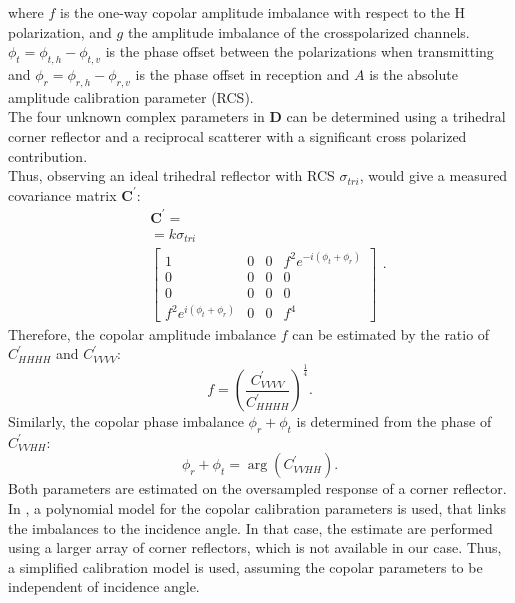 where $f$ is the one-way copolar amplitude imbalance with respect to the H polarization, and $g$ the amplitude imbalance of the crosspolarized channels. $\phi_t = \phi_{t,h} -\phi_{t,v}$ is the phase offset between the polarizations when transmitting and $\phi_{r} = \phi_{r,h} -\phi_{r,v}$ is the phase offset in reception and $A$ is the absolute amplitude calibration parameter (RCS)\cite{Ainsworth2006a, Fore2015}.\\
The four unknown complex parameters in $\mathbf{D}$ can be determined using a trihedral corner reflector and a reciprocal scatterer with a significant cross polarized contribution\cite{Sarabandi1989,Pipia2009}.\\
Thus, observing an ideal trihedral reflector with RCS $\sigma_{tri}$, would give 
a measured covariance matrix $\mathbf{C^{\prime}}$:
\begin{equation}
	\begin{aligned}
	&\mathbf{C^{\prime}} =\\
	&= k \sigma_{tri}\\
	&\begin{bmatrix}
		1 & 0 & 0 & f^2 e^{-i \left(\phi_t + \phi_r\right)}\\
		0 & 0 & 0 & 0\\
		0 & 0 & 0 & 0\\
		f^2 e^{i \left(\phi_t + \phi_r\right)} & 0 & 0 & f^4
	\end{bmatrix}
	\end{aligned}.
\end{equation}
Therefore, the  copolar amplitude imbalance $f$ can be estimated by the ratio of $C_{HHHH}^\prime$ and $C_{VVVV}^\prime$:
\begin{equation}
	f = \left(\frac{C^{\prime}_{VVVV}}{C^{\prime}_{HHHH}}\right)^{\frac{1}{4}}.
\end{equation}
Similarly, the copolar phase imbalance $\phi_r + \phi_t$ is determined from the phase of $C_{VVHH}^{\prime}$:
\begin{equation}
	\phi_r + \phi_t = \operatorname{arg}\left(C_{VVHH}^\prime\right).
\end{equation}
Both parameters are estimated on the oversampled response of a corner reflector. In \cite{Fore2015}, a polynomial model for the copolar calibration parameters is used, that links the imbalances to the incidence angle. In that case, the estimate are performed using a larger array of corner reflectors, which is not available in our case. Thus, a simplified calibration model is used, assuming the copolar parameters to be independent of incidence angle.\\ 
